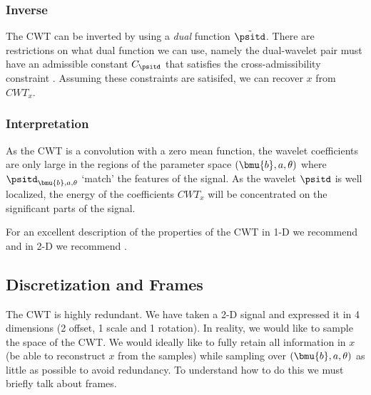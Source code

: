 \subsubsection{Inverse}
The CWT can be inverted by using a \emph{dual} function $\tilde{\psitd}$. There
are restrictions on what dual function we can use, namely the dual-wavelet pair
must have an admissible constant $C_\psitd$ that satisfies the
cross-admissibility constraint \cite{holschneider_pointwise_1991}. Assuming
these constraints are satisifed, we can recover $x$ from $CWT_x$.

\subsubsection{Interpretation}
As the CWT is a convolution with a zero mean function, the wavelet coefficients are only 
large in the regions of the parameter space $(\bmu{b}, a, \theta)$ where
$\psitd_{\bmu{b}, a, \theta}$ `match' the features of the signal. As the wavelet
$\psitd$ is well localized, the energy of the coefficients $CWT_x$ will be concentrated 
on the significant parts of the signal.

For an excellent description of the properties of the CWT in 1-D we recommend
\cite{vetterli_wavelets_2007} and in 2-D we recommend 
\cite{antoine_two-dimensional_2004}.

\subsection{Discretization and Frames}
The CWT is highly redundant. We have taken a 2-D signal and expressed it in 4
dimensions (2 offset, 1 scale and 1 rotation). In reality, we would like to sample the space
of the CWT. We would ideally like to fully 
retain all information in $x$ (be able to reconstruct $x$ from the samples)
while sampling over $(\bmu{b}, a, \theta)$ as little as possible to avoid
redundancy. To understand how to do this we must briefly talk about frames.

